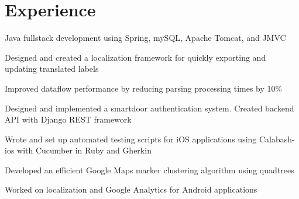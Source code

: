 \documentclass[]{peter_resume}
\begin{document}




\begin{minipage}[t]{0.74\textwidth}



\section{Experience}

\vspace{\topsep} %
\begin{tightemize}
\item Java fullstack development using Spring, mySQL, Apache Tomcat, and JMVC
\item Designed and created a localization framework for quickly exporting and updating translated labels
\item Improved dataflow performance by reducing parsing processing times by 10\%
\end{tightemize}
\sectionsep

\begin{tightemize}
\item Designed and implemented a smartdoor authentication system. Created backend API with Django REST framework
\item Wrote and set up automated testing scripts for iOS applications using Calabash-ios with Cucumber in Ruby and Gherkin
\item Developed an efficient Google Maps marker clustering algorithm using quadtrees
\item Worked on localization and Google Analytics for Android applications
\end{tightemize}
\sectionsep


\end{minipage}
\end{document}
